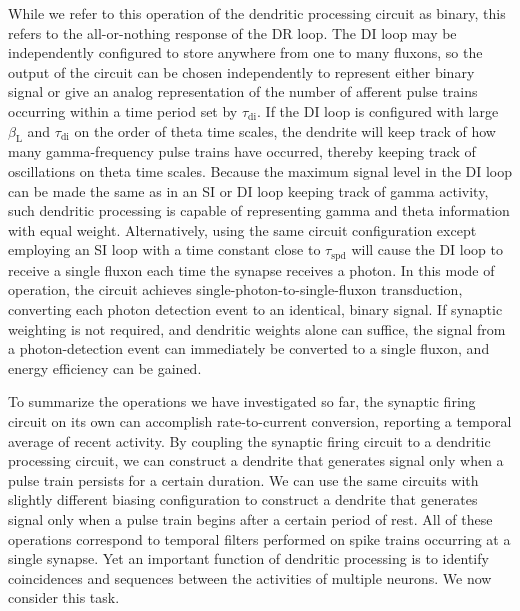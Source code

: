 \documentclass[twocolumn]{article}
\begin{document}
While we refer to this operation of the dendritic processing circuit as binary, this refers to the all-or-nothing response of the DR loop. The DI loop may be independently configured to store anywhere from one to many fluxons, so the output of the circuit can be chosen independently to represent either binary signal or give an analog representation of the number of afferent pulse trains occurring within a time period set by $\tau_{\mathrm{di}}$. If the DI loop is configured with large $\beta_{\mathrm{L}}$ and $\tau_{\mathrm{di}}$ on the order of theta time scales, the dendrite will keep track of how many gamma-frequency pulse trains have occurred, thereby keeping track of oscillations on theta time scales. Because the maximum signal level in the DI loop can be made the same as in an SI or DI loop keeping track of gamma activity, such dendritic processing is capable of representing gamma and theta information with equal weight. Alternatively, using the same circuit configuration except employing an SI loop with a time constant close to $\tau_{\mathrm{spd}}$ will cause the DI loop to receive a single fluxon each time the synapse receives a photon. In this mode of operation, the circuit achieves single-photon-to-single-fluxon transduction, converting each photon detection event to an identical, binary signal. If synaptic weighting is not required, and dendritic weights alone can suffice, the signal from a photon-detection event can immediately be converted to a single fluxon, and energy efficiency can be gained.

To summarize the operations we have investigated so far, the synaptic firing circuit on its own can accomplish rate-to-current conversion, reporting a temporal average of recent activity. By coupling the synaptic firing circuit to a dendritic processing circuit, we can construct a dendrite that generates signal only when a pulse train persists for a certain duration. We can use the same circuits with slightly different biasing configuration to construct a dendrite that generates signal only when a pulse train begins after a certain period of rest. All of these operations correspond to temporal filters performed on spike trains occurring at a single synapse. Yet an important function of dendritic processing is to identify coincidences and sequences between the activities of multiple neurons. We now consider this task.
\end{document}
